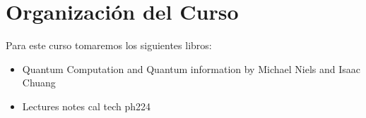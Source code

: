 \section{Organización del Curso}
Para este curso tomaremos los siguientes libros:

\begin{itemize}
	\item Quantum Computation and Quantum information by Michael Niels and Isaac Chuang
	\item Lectures notes cal tech ph224
\end{itemize}
